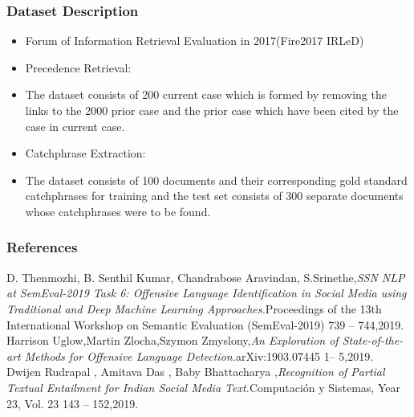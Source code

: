 \documentclass{beamer}
\begin{document}
\begin{frame}\frametitle{Dataset Description}
	\begin{itemize}
		\item  Forum of Information Retrieval Evaluation
in 2017(Fire2017  IRLeD)
	\end{itemize}
\begin{itemize}
 \item Precedence Retrieval:
\end{itemize}
		\begin{itemize}
			 \item The dataset consists of 200 current case which is formed by removing the links to the 2000 prior case and the prior case which have been cited by the case in current case.
		\end{itemize}
\begin{itemize}
 \item Catchphrase Extraction:
\end{itemize}
	\begin{itemize}
\item The dataset consists of 100 documents and their corresponding gold standard catchphrases for training and the test set consists of 300 separate documents whose catchphrases were to be found.
	\end{itemize}
\end{frame}



\begin{frame}\frametitle{References}
\begin{thebibliography}{99}
    
	D. Thenmozhi, B. Senthil Kumar, Chandrabose Aravindan, S.Srinethe,{\em SSN NLP at SemEval-2019 Task 6: Offensive Language Identification in Social Media using Traditional and Deep Machine Learning Approaches.}Proceedings of the 13th International Workshop on Semantic Evaluation (SemEval-2019) 739 -- 744,2019.
	Harrison Uglow,Martin Zlocha,Szymon Zmyslony,{\em An Exploration of State-of-the-art Methods for Offensive Language Detection.}arXiv:1903.07445 1-- 5,2019.
	Dwijen Rudrapal , Amitava Das  , Baby Bhattacharya ,{\em Recognition of Partial Textual Entailment for Indian Social Media Text.}Computación y Sistemas, Year 23, Vol. 23  143 -- 152,2019.
\end{thebibliography}
\end{frame}
	
\end{document}
